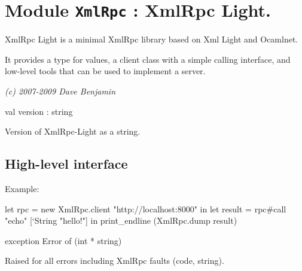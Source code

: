\documentclass[11pt]{article}
\begin{document}
\tableofcontents
\section{Module {\tt{XmlRpc}} : XmlRpc Light.}
\label{module:XmlRpc}



    XmlRpc Light is a minimal XmlRpc library based on Xml Light and Ocamlnet.


    It provides a type for values, a client class with a simple calling
    interface, and low-level tools that can be used to implement a server.


    {\it (c) 2007-2009 Dave Benjamin}



\ocamldocvspace{0.5cm}



\label{val:XmlRpc.version}\begin{ocamldoccode}
val version : string
\end{ocamldoccode}
\begin{ocamldocdescription}
Version of XmlRpc-Light as a string.


\end{ocamldocdescription}




\subsection{High-level interface}




Example: \begin{ocamldoccode}

    let rpc = new XmlRpc.client "http://localhost:8000" in
    let result = rpc#call "echo" [`String "hello!"] in
    print_endline (XmlRpc.dump result) 
\end{ocamldoccode}




\label{exception:XmlRpc.Error}\begin{ocamldoccode}
exception Error of (int * string)
\end{ocamldoccode}
\begin{ocamldocdescription}
Raised for all errors including XmlRpc faults (code, string).


\end{ocamldocdescription}
\end{document}
